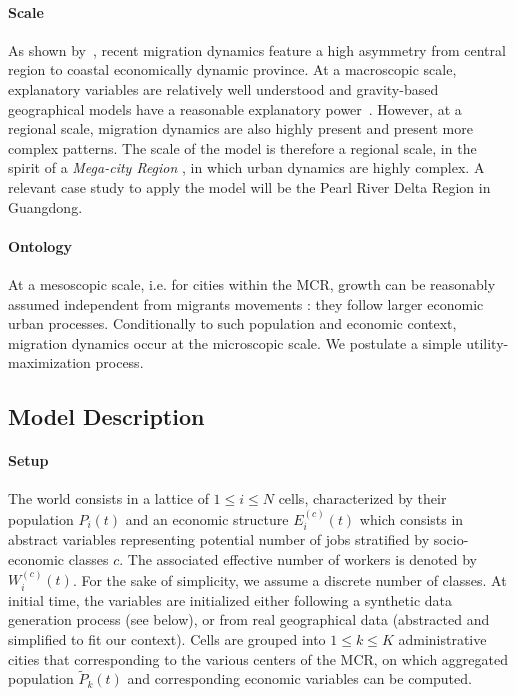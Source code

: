 \paragraph{Scale} As shown by~\cite{chan2012migration}, recent migration dynamics feature a high asymmetry from central region to coastal economically dynamic province. At a macroscopic scale, explanatory variables are relatively well understood and gravity-based geographical models have a reasonable explanatory power~\cite{fan2005modeling}. However, at a regional scale, migration dynamics are also highly present and present more complex patterns. The scale of the model is therefore a regional scale, in the spirit of a \emph{Mega-city Region} \cite{hall2006polycentric}, in which urban dynamics are highly complex. A relevant case study to apply the model will be the Pearl River Delta Region in Guangdong.

\paragraph{Ontology} At a mesoscopic scale, i.e. for cities within the MCR, growth can be reasonably assumed independent from migrants movements : they follow larger economic urban processes. Conditionally to such population and economic context, migration dynamics occur at the microscopic scale. We postulate a simple utility-maximization process.

\subsection{Model Description}

\paragraph{Setup}

The world consists in a lattice of $1 \leq i \leq N$ cells, characterized by their population $P_i(t)$ and an economic structure $E_i^{(c)}(t)$ which consists in abstract variables representing potential number of jobs stratified by socio-economic classes $c$. The associated effective number of workers is denoted by $W_i^{(c)}(t)$. For the sake of simplicity, we assume a discrete number of classes. At initial time, the variables are initialized either following a synthetic data generation process (see below), or from real geographical data (abstracted and simplified to fit our context). Cells are grouped into $1\leq k\leq K$ administrative cities that corresponding to the various centers of the MCR, on which aggregated population $\tilde{P}_k(t)$ and corresponding economic variables can be computed.

